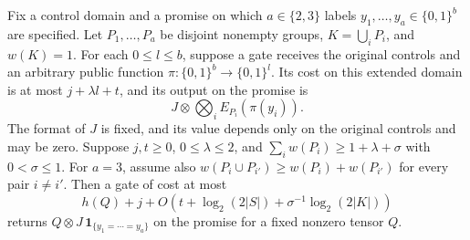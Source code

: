 \begin{lemma}\label{lem:oracle}
Fix a control domain and a promise on which \(a\in\{2,3\}\) labels
\(y_1,\ldots,y_a\in\{0,1\}^b\) are specified. Let \(P_1,\ldots,P_a\)
be disjoint nonempty groups, \(K=\bigcup_iP_i\), and \(w(K)=1\).
For each \(0\le l\le b\), suppose a gate receives the original
controls and an arbitrary public function
\(\pi:\{0,1\}^b\to\{0,1\}^l\). Its cost on this extended domain is
at most \(j+\lambda l+t\), and its output on the promise is
\[
                     J\otimes\bigotimes_i E_{P_i}(\pi(y_i)).
\]
The format of \(J\) is fixed, and its value depends only on the
original controls and may be zero. Suppose \(j,t\ge0\),
\(0\le\lambda\le2\), and
\(\sum_i w(P_i)\ge1+\lambda+\sigma\) with \(0<\sigma\le1\).
For \(a=3\), assume also
\(w(P_i\cup P_{i'})\ge w(P_i)+w(P_{i'})\) for every pair \(i\ne i'\).
Then a gate of cost at most
\[
              h(Q)+j+O\!\left(t+\log_2(2|S|)
                           +\sigma^{-1}\log_2(2|K|)\right)
\]
returns \(Q\otimes J\,\mathbf 1_{\{y_1=\cdots=y_a\}}\) on the promise
for a fixed nonzero tensor \(Q\).
\end{lemma}

